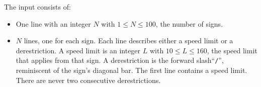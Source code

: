 
    The input consists of:
    \begin{itemize}
        \item One line with an integer $N$ with $1\leq N\leq 100$, the number of signs.
        \item $N$ lines, one for each sign. 
	  Each line describes either a speed limit or a derestriction.
	  A speed limit  is an integer $L$  with $10\leq L\leq 160$, the speed limit that applies from that sign.
	  A derestriction is the forward slash``\texttt{/}'', reminiscent of the sign's diagonal bar.
	  The first line contains a speed limit.
	  There are never two consecutive derestrictions.
    \end{itemize}
